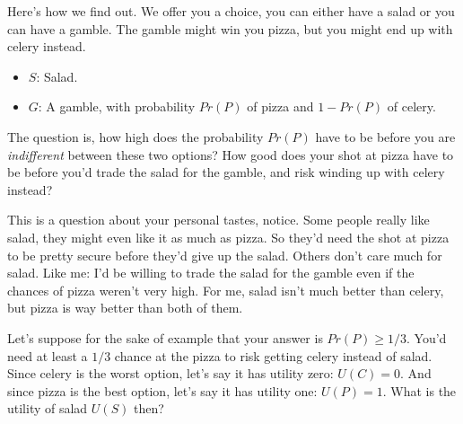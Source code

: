 \documentclass[justified]{tufte-book}
\providecommand{\tightlist}{%
  \setlength{\itemsep}{0pt}\setlength{\parskip}{0pt}}
\renewcommand{\u}{U}
\newcommand{\p}{Pr}
\theoremstyle{definition}
\theoremstyle{definition}
\theoremstyle{definition}
\theoremstyle{remark}
\begin{document}
Here's how we find out. We offer you a choice, you can either have a salad or you can have a gamble. The gamble might win you pizza, but you might end up with celery instead.

\begin{itemize}
\tightlist
\item
  \(S\): Salad.
\item
  \(G\): A gamble, with probability \(\p(P)\) of pizza and \(1-\p(P)\) of celery.
\end{itemize}

The question is, how high does the probability \(\p(P)\) have to be before you are \emph{indifferent} between these two options? How good does your shot at pizza have to be before you'd trade the salad for the gamble, and risk winding up with celery instead?

This is a question about your personal tastes, notice. Some people really like salad, they might even like it as much as pizza. So they'd need the shot at pizza to be pretty secure before they'd give up the salad. Others don't care much for salad. Like me: I'd be willing to trade the salad for the gamble even if the chances of pizza weren't very high. For me, salad isn't much better than celery, but pizza is way better than both of them.

Let's suppose for the sake of example that your answer is \(\p(P) \geq 1/3\). You'd need at least a \(1/3\) chance at the pizza to risk getting celery instead of salad. Since celery is the worst option, let's say it has utility zero: \(\u(C)=0\). And since pizza is the best option, let's say it has utility one: \(\u(P)=1\). What is the utility of salad \(\u(S)\) then?
\end{document}
